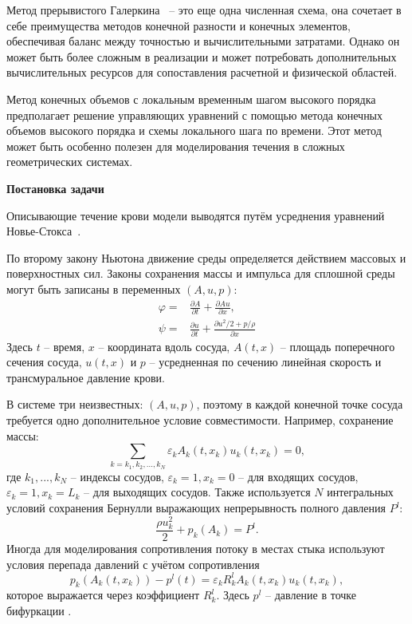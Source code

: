Метод прерывистого Галеркина~\cite{yao:2017} -- это еще одна численная схема, она сочетает в себе преимущества методов конечной разности и конечных элементов, 
обеспечивая баланс между точностью и вычислительными затратами. Однако он может быть более сложным в реализации и может
потребовать дополнительных вычислительных ресурсов для сопоставления расчетной и физической областей.

Метод конечных объемов с локальным временным шагом высокого порядка~\cite{mueller:2015} предполагает решение управляющих уравнений 
с помощью метода конечных объемов высокого порядка и схемы локального шага по времени. 
Этот метод может быть особенно полезен для моделирования течения в сложных геометрических системах.

{\bf Постановка задачи}

Описывающие течение крови модели выводятся путём усреднения уравнений Новье-Стокса~\cite{Formaggia:2009}. 

По второму закону Ньютона движение среды определяется действием массовых и поверхностных сил. 
Законы сохранения массы и импульса для сплошной среды могут быть
записаны в переменных $(A, u, p)$: 
\begin{align}
    \label{eq:mass-balance}
    \varphi=&\frac{\partial A}{\partial t}+\frac{\partial Au}{\partial x},\\
    \label{eq:momentum-balance}
    \psi=&\frac{\partial u}{\partial t}+ \frac{\partial u^2/2+p/\rho}{\partial x}
\end{align}
Здесь $t$ -- время, $x$ -- координата вдоль сосуда, $A(t, x)$ -- площадь поперечного сечения сосуда, 
$u(t, x)$ и $p$ -- усредненная по сечению линейная скорость и трансмуральное давление крови. 

В системе три неизвестных: $(A, u, p)$, поэтому в каждой конечной точке сосуда требуется одно дополнительное условие совместимости.
Например, сохранение массы:
\begin{equation}
    \label{eq:conserv-mass}
    \sum_{k=k_1,k_2,...,k_N} \varepsilon_k A_k(t,x_k)u_k(t,x_k)=0,
\end{equation}
где {$k_1,...,k_N$} -- индексы сосудов, $\varepsilon_k=1, x_k=0$ -- для входящих сосудов,
$\varepsilon_k=1, x_k=L_k$ -- для выходящих сосудов.
Также используется $N$ интегральных условий сохранения Бернулли выражающих непрерывность полного давления $P^l$:
\begin{equation}
    \label{eq:bernulli}
    \frac{\rho u^2_k}{2}+{p_k(A_k)}=P^l.
\end{equation}
Иногда для моделирования сопротивления потоку в местах стыка используют условия перепада давлений
с учётом сопротивления
\begin{equation}
    \label{eq:p-pressure}
    p_k\left(A_k\left(t,x_k\right)\right)-p^l(t)=\varepsilon_k R^l_k A_k(t,x_k)u_k(t,x_k),
\end{equation}
которое выражается через коэффициент $R^l_k$. Здесь $p^l$ -- давление в точке бифуркации \cite{bessonov:2014}.

